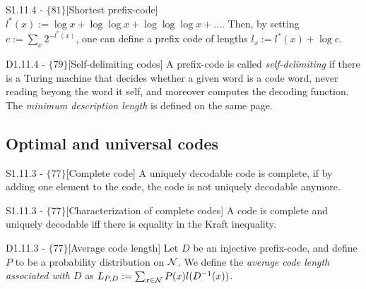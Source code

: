 \documentclass{article}
\begin{document}
\begin{flexilemma}{S1.11.4 - $\{81\}$}[Shortest prefix-code]
      $l^\ast(x) := \log x + \log \log x + \log \log \log x + \ldots$. Then, by setting $c := \sum_{x} 2^{-l^\ast(x)}$, one can define a prefix code of lengths $l_x := l^\ast(x) + \log c$.
\end{flexilemma}


\begin{flexidefinition}{D1.11.4 - $\{79\}$}[Self-delimiting codes] A prefix-code is called \textit{self-delimiting} if there is a Turing machine that decides whether a given word is a code word, never reading beyong the word it self, and moreover computes the decoding function. The \textit{minimum description length} is defined on the same page.
\end{flexidefinition}


\subsection{Optimal and universal codes}

\begin{flexidefinition}{S1.11.3 - $\{77\}$}[Complete code]
     A uniquely decodable code is complete, if by adding one element to the code, the code is not uniquely decodable anymore.
\end{flexidefinition}

\begin{flexitheorem}{S1.11.3 - $\{77\}$}[Characterization of complete codes]
    A code is complete and uniquely decodable iff there is equality in the Kraft inequality.
\end{flexitheorem}

\begin{flexidefinition}{D1.11.3 - $\{77\}$}[Average code length]
     Let $D$ be an injective prefix-code, and define $P$ to be a probability distribution on $\mathcal{N}$. We define the \textit{average code length associated with $D$} as $L_{P,D} := \sum_{x \in \mathcal{N}} P(x) l(D^{-1}(x))$.
\end{flexidefinition}
\end{document}
